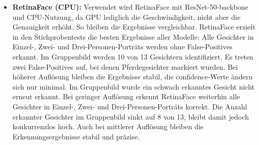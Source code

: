 \begin{itemize}
%	
	\item \textbf{RetinaFace (CPU):} Verwendet wird RetinaFace mit ResNet-50-\gls{backbone} und CPU-Nutzung, da GPU lediglich die Geschwindigkeit, nicht aber die Genauigkeit erhöht. So bleiben die Ergebnisse vergleichbar. RetinaFace erzielt in den Stichprobentests die besten Ergebnisse aller Modelle: Alle Gesichter in Einzel-, Zwei- und Drei-Personen-Porträts werden ohne False-Positives erkannt. Im Gruppenbild werden 10 von 13 Gesichtern identifiziert. Es treten zwei False-Positives auf, bei denen Pferdegesichter markiert wurden. Bei höherer Auflösung bleiben die Ergebnisse stabil, die \gls{confidence}-Werte ändern sich nur minimal. Im Gruppenbild wurde ein schwach erkanntes Gesicht nicht erneut erkannt. Bei geringer Auflösung erkennt RetinaFace weiterhin alle Gesichter in Einzel-, Zwei- und Drei-Personen-Porträts korrekt. Die Anzahl erkannter Gesichter im Gruppenbild sinkt auf 8 von 13, bleibt damit jedoch konkurrenzlos hoch. Auch bei mittlerer Auflösung bleiben die Erkennungsergebnisse stabil und präzise.
\end{itemize}

